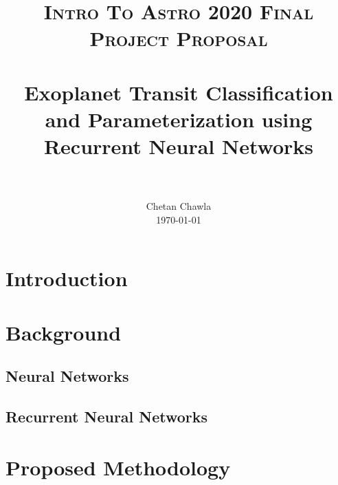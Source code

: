 \documentclass[paper=letterpaper, fontsize=11pt]{scrartcl}
\title{
		\usefont{OT1}{bch}{b}{n}
		\normalfont \normalsize \textsc{Intro To Astro 2020 Final Project Proposal} \\ [25pt]
		\horrule{0.5pt} \\[0.4cm]
		\huge Exoplanet Transit Classification and Parameterization using Recurrent Neural Networks \\
		\horrule{2pt} \\[0.5cm]
}
\author{
	\normalfont 				\normalsize
        Chetan Chawla	\\		\normalsize
        \today
}
\date{}
\numberwithin{equation}{section}		%
\numberwithin{figure}{section}			%
\numberwithin{table}{section}			%
\begin{document}
\maketitle

\section{Introduction}


\section{Background}






\subsection{Neural Networks}

\subsection{Recurrent Neural Networks}




\section{Proposed Methodology}
\end{document}
